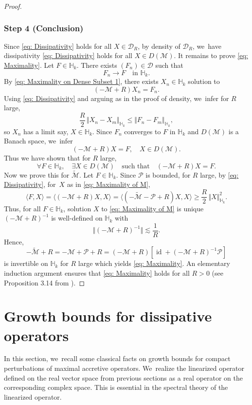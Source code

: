 \documentclass[10pt]{amsart}
\theoremstyle{plain}
\theoremstyle{definition}
\DeclareMathOperator{\id}{id}
\begin{document}
\begin{proof}
\subsubsection*{Step 4 (Conclusion)}
Since \eqref{eq: Dissipativity} holds for all $X\in \mathcal D_R$, by density of $\mathcal D_R$, we~have dissipativity \ie \eqref{eq: Dissipativity} holds for all $X\in D(\mathcal M)$. It remains to prove \eqref{eq: Maximality}. Let $F\in \mathbb H_k$. There exists $(F_n)\in \mathcal D$ such that
\[
F_n\to F\quad\text{in }\mathbb H_k.
\]
By \eqref{eq: Maximality on Dense Subset 1}, there exists $X_n\in\mathbb H_k$ solution to
\[
(-\mathcal M+R)X_n=F_n.
\]
Using \eqref{eq: Dissipativity} and arguing as in the proof of density, we~infer for $R$ large,
\[
\frac{R}{2}\,\Vert X_n-X_m\Vert_{\mathbb H_k}\le \Vert F_n-F_m\Vert_{\mathbb H_k},
\]
so $X_n$ has a limit say, $X\in \mathbb H_k$. Since $F_n$ converges to $F$ in $\mathbb H_k$ and $D(\mathcal M)$ is a Banach space, we~infer
\[
(-\mathcal M+R)X=F,\quad X\in D(\mathcal M).
\]
Thus we have shown that for $R$ large,
\begin{equation}
\label{eq: Maximality of M}
\forall F\in \mathbb H_k,\quad \exists X\in D(\mathcal M)\quad \text{such that}\quad (-\mathcal M+R)X=F.
\end{equation}
Now we prove this for $\tilde{\mathcal M}$. Let $F\in\mathbb H_k$. Since $\mathcal P$ is bounded, for $R$ large, by \eqref{eq: Dissipativity}, for~$X$ as in \eqref{eq: Maximality of M},
\[
\langle F,X\rangle =\langle(-\mathcal M+R)X,X\rangle = \langle(-\tilde{\mathcal M}-\mathcal P+R)X,X\rangle \ge \frac{R}{2}\,\Vert X\Vert_{\mathbb H_k}^2.
\]
Thus, for all $F\in \mathbb H_k$, solution $X$ to \eqref{eq: Maximality of M} is unique \ie $(-\mathcal M+R)^{-1}$ is well-defined on $\mathbb H_k$ with
\[
\Vert (-\mathcal M+R)^{-1}\Vert\lesssim \frac{1}{R}.
\]
Hence,
\[
-\tilde{\mathcal M}+R=-\mathcal M+\mathcal P+R=(-\mathcal M+R)[\id+(-\mathcal M+R)^{-1}\mathcal P]
\]
is invertible on $\mathbb H_k$ for $R$ large which yields \eqref{eq: Maximality}. An elementary induction argument ensures that \eqref{eq: Maximality} holds for all $R>0$ (see Proposition 3.14 from \cite{EN}).
\end{proof}

\section{Growth bounds for dissipative operators}
\label{sec: 6}

In this section, we~recall some classical facts on growth bounds for compact perturbations of maximal accretive operators. We~realize the linearized operator defined on the real vector space from previous sections as a real operator on the corresponding complex space. This is essential in the spectral theory of the linearized operator.
\end{document}
